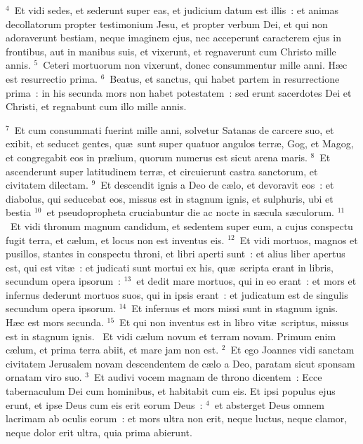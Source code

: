 ${}^{4}$~Et vidi sedes, et sederunt super eas, et judicium datum est illis~: et animas decollatorum propter testimonium Jesu, et propter verbum Dei, et qui non adoraverunt bestiam, neque imaginem ejus, nec acceperunt caracterem ejus in frontibus, aut in manibus suis, et vixerunt, et regnaverunt cum Christo mille annis.
${}^{5}$~Ceteri mortuorum non vixerunt, donec consummentur mille anni. H\ae c est resurrectio prima.
${}^{6}$~Beatus, et sanctus, qui habet partem in resurrectione prima~: in his secunda mors non habet potestatem~: sed erunt sacerdotes Dei et Christi, et regnabunt cum illo mille annis.


${}^{7}$~Et cum consummati fuerint mille anni, solvetur Satanas de carcere suo, et exibit, et seducet gentes, qu\ae\ sunt super quatuor angulos terr\ae , Gog, et Magog, et congregabit eos in pr\ae lium, quorum numerus est sicut arena maris.
${}^{8}$~Et ascenderunt super latitudinem terr\ae , et circuierunt castra sanctorum, et civitatem dilectam.
${}^{9}$~Et descendit ignis a Deo de c\ae lo, et devoravit eos~: et diabolus, qui seducebat eos, missus est in stagnum ignis, et sulphuris, ubi et bestia
${}^{10}$~et pseudopropheta cruciabuntur die ac nocte in s\ae cula s\ae culorum.
${}^{11}$~Et vidi thronum magnum candidum, et sedentem super eum, a cujus conspectu fugit terra, et c\ae lum, et locus non est inventus eis.
${}^{12}$~Et vidi mortuos, magnos et pusillos, stantes in conspectu throni, et libri aperti sunt~: et alius liber apertus est, qui est vit\ae~: et judicati sunt mortui ex his, qu\ae\ scripta erant in libris, secundum opera ipsorum~:
${}^{13}$~et dedit mare mortuos, qui in eo erant~: et mors et infernus dederunt mortuos suos, qui in ipsis erant~: et judicatum est de singulis secundum opera ipsorum.
${}^{14}$~Et infernus et mors missi sunt in stagnum ignis. H\ae c est mors secunda.
${}^{15}$~Et qui non inventus est in libro vit\ae\ scriptus, missus est in stagnum ignis.
~\lettrine[lines=10,image=true,loversize=0.05,lraise=-0.03]{E}{}t vidi c\ae lum novum et terram novam. Primum enim c\ae lum, et prima terra abiit, et mare jam non est.
${}^{2}$~Et ego Joannes vidi sanctam civitatem Jerusalem novam descendentem de c\ae lo a Deo, paratam sicut sponsam ornatam viro suo.
${}^{3}$~Et audivi vocem magnam de throno dicentem~: Ecce tabernaculum Dei cum hominibus, et habitabit cum eis. Et ipsi populus ejus erunt, et ipse Deus cum eis erit eorum Deus~:
${}^{4}$~et absterget Deus omnem lacrimam ab oculis eorum~: et mors ultra non erit, neque luctus, neque clamor, neque dolor erit ultra, quia prima abierunt.
